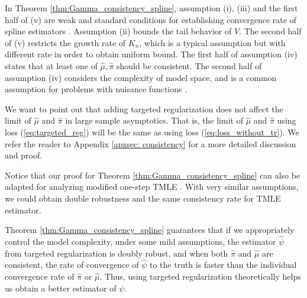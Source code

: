 \begin{remark}
In Theorem \ref{thm:Gamma_consistency_spline}, assumption (i), (iii)  and the first half of (v) are weak and standard conditions for establishing convergence rate of spline estimators \citep{huang2003local, huang2004polynomial}. Assumption (ii) bounds the tail behavior of $V$. The second half of (v) restricts the growth rate of $K_n$, which is a typical assumption \citep{huang2003local, huang2004polynomial} but with different rate in order to obtain uniform bound. The first half of assumption (iv) states that at least one of $\hat \mu,\hat\pi$ should be consistent. The second half of assumption (iv) considers the complexity of model space, and is a common assumption for problems with nuisance functions \citep{kennedy2017non}. %
\end{remark}


\begin{remark} \label{rmk: consistency}

We want to point out that adding targeted regularization does not affect the limit of $\hat{\mu}$ and $\hat{\pi}$ in large sample asymptotics. That is, the limit of $\hat{\mu}$ and $\hat{\pi}$ using loss (\ref{eq:targeted_reg}) will be the same as using loss (\ref{eq:loss_without_tr}). We refer the reader to Appendix \ref{apxsec: consistency} for a more detailed discussion and proof.
\end{remark}

Notice that our proof for Theorem \ref{thm:Gamma_consistency_spline} can also be adapted for analyzing modified one-step TMLE \citep{van2006targeted}. With very similar assumptions, we could obtain double robustness and the same consistency rate for TMLE estimator.

Theorem \ref{thm:Gamma_consistency_spline} guarantees that if we appropriately control the model complexity, under some mild assumptions, the estimator $\widehat\psi$ from targeted regularization is doubly robust, and when both $\hat\pi$ and $\hat\mu$ are consistent, the rate of convergence of $\widehat\psi$ to the truth is faster than the individual convergence rate of $\hat\pi$ or $\hat\mu$. Thus, using targeted regularization theoretically helps us obtain a better estimator of $\psi$.


